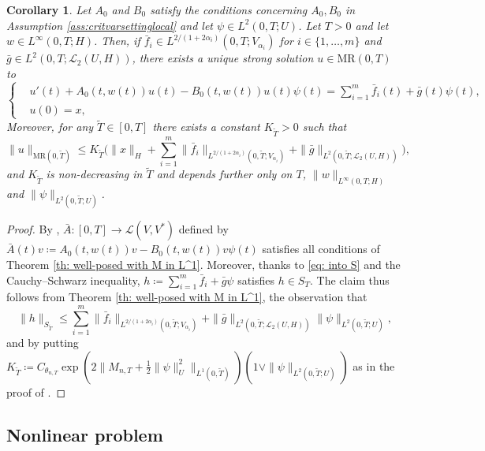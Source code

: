 \documentclass{amsart}
\renewcommand{\MR}{\mathrm{MR}}
\newcommand{\UH}{\mathscr{L}_2(U,H)}
\newcommand{\<}{\langle}
\newcommand{\?}{\rangle}
\newcommand{\ceqq}{\coloneqq}
\theoremstyle{plain}
\theoremstyle{remark}
\theoremstyle{plain}
\newtheorem{corollary}[theorem]{Corollary}
\numberwithin{equation}{section}
\begin{document}
\begin{corollary}\label{cor: skeleton MR linearized crit var setting}
Let $A_0$ and $B_0$ satisfy the conditions concerning $A_0,B_0$ in Assumption \ref{ass:critvarsettinglocal} and let $\psi\in L^2(0,T;U)$.
Let $T>0$ and let $w\in L^\infty(0,T;H)$.
Then, if $\bar{f}_i \in L^{2/(1+2\alpha_i)}(0,T;V_{\alpha_i})$ for $i\in\{1,\ldots,m\}$ and $\bar{g}\in L^2(0,T;\UH)$, there exists a unique strong solution  $u\in \MR(0,T)$ to
\begin{equation}\label{eq:skeletonlinear}
\begin{cases}
    &u'(t)+A_0(t,w(t))u(t)-B_0(t,w(t))u(t)\psi(t)=\sum_{i=1}^m\bar{f}_i(t)+\bar{g}(t)\psi(t), \\
    &u(0)=x,
\end{cases}
\end{equation}
Moreover, for any $\tilde{T}\in[0,T]$ there exists a constant $K_{\tilde{T}}>0$ such that
 \begin{equation}\label{def: maxreg}
 \|u\|_{\MR(0,\tilde{T})}\leq K_{\tilde{T}}\Big(\|x\|_H+\textstyle{\sum_{i=1}^{m}}\|\bar{f}_i\|_{L^{2/(1+2\alpha_i)}(0,\tilde{T};V_{\alpha_i})} +\|\bar{g}\|_{L^2(0,\tilde{T};\UH)}\Big),
 \end{equation} 
and $K_{\tilde{T}}$ is non-decreasing in $\tilde{T}$ and depends further only on $T$, $\|w\|_{L^\infty(0,T;H)}$ and $\|\psi\|_{L^2(0,\tilde{T};U)}$.
\end{corollary}
\begin{proof}
By \cite[Cor.\ 3.5]{TV24},  
 $\bar{A}\colon [0,T]\to\mathscr{L}(V,V^*)$ defined  by $\bar{A}(t)v\coloneqq  A_0(t,w(t))v-B_0(t,w(t))v\psi(t)$ satisfies all conditions of Theorem \ref{th: well-posed with M in L^1}. Moreover, thanks to \eqref{eq: into S} and the Cauchy--Schwarz inequality, $h\ceqq \sum_{i=1}^{m}\bar{f}_i+\bar{g}\psi$ satisfies $h\in S_T$. 
The claim thus follows from Theorem \ref{th: well-posed with M in L^1},  the observation that
\[
\|h\|_{S_{\tilde{T}}}\leq \textstyle{\sum_{i=1}^{m}}\|\bar{f}_i\|_{L^{2/(1+2\alpha_i)}(0,\tilde{T};V_{\alpha_i})} +\|\bar{g}\|_{L^2(0,\tilde{T};\UH)}\|\psi\|_{L^2(0,\tilde{T};U)},
\] 
and by putting $K_{\tilde{T}}\coloneqq C_{\theta_{n,T}}\exp(2\|M_{n,T}+\frac{1}{2}\|\psi\|_U^2\|_{L^1(0,\tilde{T})})(1\vee\|\psi\|_{L^2(0,\tilde{T};U)})$ as in the proof of \cite[Cor.\ 3.5]{TV24}. 
\end{proof}
  

\subsection{Nonlinear problem} 
\end{document}
